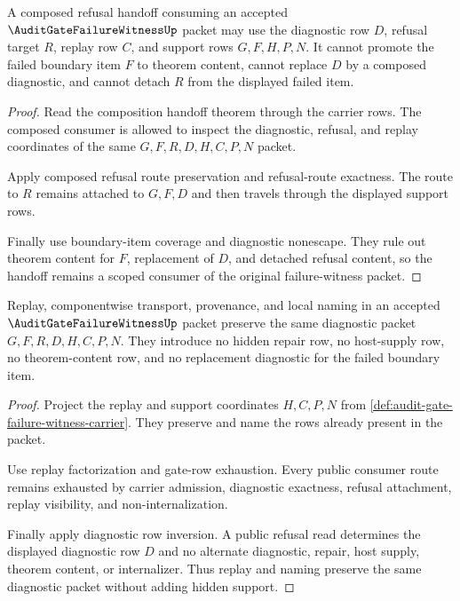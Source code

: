 \begin{theorem}
\label{thm:audit-gate-failure-witness-refusal-handoff-scope}
A composed refusal handoff consuming an accepted $\AuditGateFailureWitnessUp$ packet may use the diagnostic row $D$, refusal target $R$, replay row $C$, and support rows $G,F,H,P,N$. It cannot promote the failed boundary item $F$ to theorem content, cannot replace $D$ by a composed diagnostic, and cannot detach $R$ from the displayed failed item.
\end{theorem}
\begin{proof}
Read the composition handoff theorem through the carrier rows. The composed consumer is allowed to inspect the diagnostic, refusal, and replay coordinates of the same $G,F,R,D,H,C,P,N$ packet.

Apply composed refusal route preservation and refusal-route exactness. The route to $R$ remains attached to $G,F,D$ and then travels through the displayed support rows.

Finally use boundary-item coverage and diagnostic nonescape. They rule out theorem content for $F$, replacement of $D$, and detached refusal content, so the handoff remains a scoped consumer of the original failure-witness packet.
\end{proof}

\begin{theorem}
\label{thm:audit-gate-failure-witness-replay-ledger-scope}
Replay, componentwise transport, provenance, and local naming in an accepted $\AuditGateFailureWitnessUp$ packet preserve the same diagnostic packet $G,F,R,D,H,C,P,N$. They introduce no hidden repair row, no host-supply row, no theorem-content row, and no replacement diagnostic for the failed boundary item.
\end{theorem}
\begin{proof}
Project the replay and support coordinates $H,C,P,N$ from \autoref{def:audit-gate-failure-witness-carrier}. They preserve and name the rows already present in the packet.

Use replay factorization and gate-row exhaustion. Every public consumer route remains exhausted by carrier admission, diagnostic exactness, refusal attachment, replay visibility, and non-internalization.

Finally apply diagnostic row inversion. A public refusal read determines the displayed diagnostic row $D$ and no alternate diagnostic, repair, host supply, theorem content, or internalizer. Thus replay and naming preserve the same diagnostic packet without adding hidden support.
\end{proof}

